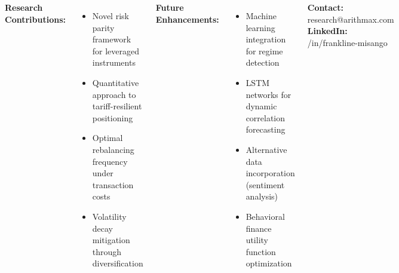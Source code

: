 \documentclass[25pt, a0paper, portrait, margin=0mm, innermargin=15mm, blockverticalspace=15mm, colspace=15mm, subcolspace=8mm]{tikzposter}
\begin{document}
\begin{columns}
{        \vspace{15pt}
        \textbf{Research Contributions:}
        \begin{itemize}[leftmargin=15pt]
            \item Novel risk parity framework for leveraged instruments
            \item Quantitative approach to tariff-resilient positioning
            \item Optimal rebalancing frequency under transaction costs
            \item Volatility decay mitigation through diversification
        \end{itemize}
        
        \vspace{15pt}
        \textbf{Future Enhancements:}
        \begin{itemize}[leftmargin=15pt]
            \item Machine learning integration for regime detection
            \item LSTM networks for dynamic correlation forecasting
            \item Alternative data incorporation (sentiment analysis)
            \item Behavioral finance utility function optimization
        \end{itemize}
        
        \vspace{15pt}
        \textcolor{arithmaxblue}{\textbf{Contact:}} research@arithmax.com \textbar{} \textcolor{arithmaxblue}{\textbf{LinkedIn:}} /in/frankline-misango
    }
    
\end{columns}
\end{document}
